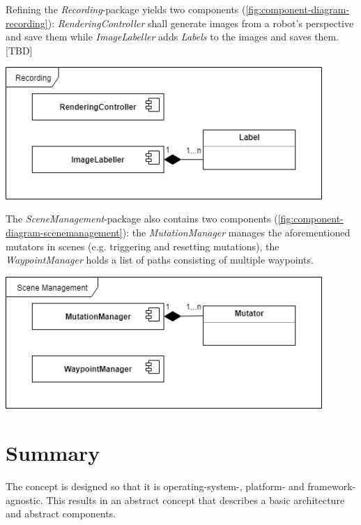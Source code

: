 Refining the \textit{Recording}-package yields two components (\ref{fig:component-diagram-recording}): \textit{RenderingController} shall generate images from a robot's perspective and save them while \textit{ImageLabeller} adds \textit{Labels} to the images and saves them. [TBD]

\begin{center}
\noindent\includegraphics[width=12cm]{tex/img/ch04/ComponentDiagram_Recording03.png}
\label{fig:component-diagram-recording}
\end{center}

The \textit{SceneManagement}-package also contains two components (\ref{fig:component-diagram-scenemanagement}): the \textit{MutationManager} manages the aforementioned mutators in scenes (e.g. triggering and resetting mutations), the \textit{WaypointManager} holds a list of paths consisting of multiple waypoints.

\begin{center}
\noindent\includegraphics[width=12cm]{tex/img/ch04/ComponentDiagram_SceneManagement02.png}
\label{fig:component-diagram-scenemanagement}
\end{center}


\section{Summary}
The concept is designed so that it is operating-system-, platform- and framework-agnostic. This results in an abstract concept that describes a basic architecture and abstract components.